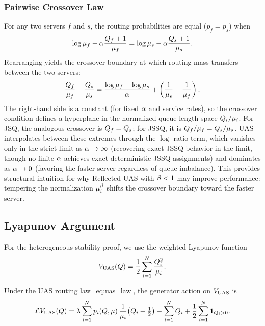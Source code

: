 \subsubsection{Pairwise Crossover Law}
For any two servers $f$ and $s$, the routing probabilities are equal ($p_f = p_s$) when
\begin{equation}
\label{eq:uas_crossover_1}
\log \mu_f - \alpha\frac{Q_{f}+1}{\mu_f} = \log \mu_s - \alpha\frac{Q_{s}+1}{\mu_s}.
\end{equation}
Rearranging yields the crossover boundary at which routing mass transfers between the two servers:
\begin{equation}
\label{eq:uas_crossover_2}
\frac{Q_{f}}{\mu_f} - \frac{Q_{s}}{\mu_s} = \frac{\log \mu_f - \log \mu_s}{\alpha} + \left(\frac{1}{\mu_s} - \frac{1}{\mu_f}\right).
\end{equation}
The right-hand side is a constant (for fixed $\alpha$ and service rates), so the crossover condition defines a hyperplane in the normalized queue-length space $Q_{i}/\mu_i$.
For JSQ, the analogous crossover is $Q_{f} = Q_{s}$; for JSSQ, it is $Q_{f}/\mu_f = Q_{s}/\mu_s$.
UAS interpolates between these extremes through the $\log$-ratio term, which vanishes only in the strict limit as $\alpha \to \infty$ (recovering exact JSSQ behavior in the limit, though no finite $\alpha$ achieves exact deterministic JSSQ assignments) and dominates as $\alpha \to 0$ (favoring the faster server regardless of queue imbalance).
This provides structural intuition for why Reflected UAS with $\beta < 1$ may improve performance: tempering the normalization $\mu_i^{\beta}$ shifts the crossover boundary toward the faster server.

\subsection{Lyapunov Argument}
\label{sec:uas:lyapunov}

For the heterogeneous stability proof, we use the weighted Lyapunov function
\begin{equation}
\label{eq:uas_lyapunov}
V_{\mathrm{UAS}}(Q) = \frac{1}{2}\sum_{i=1}^{N} \frac{Q_{i}^2}{\mu_i}.
\end{equation}

\begin{lemma}
\label{lem:uas_drift}
Under the UAS routing law~\eqref{eq:uas_law}, the generator action on $V_{\mathrm{UAS}}$ is
\begin{equation}
\label{eq:uas_drift_identity}
\mathcal{L} V_{\mathrm{UAS}}(Q)
= \lambda \sum_{i=1}^{N} p_{i}(Q, \mu)\,\frac{1}{\mu_i}\bigl(Q_{i} + \tfrac{1}{2}\bigr)
- \sum_{i=1}^{N} Q_{i}
+ \frac{1}{2}\sum_{i=1}^{N} \mathbf{1}_{Q_{i}>0}.
\end{equation}
\end{lemma}

